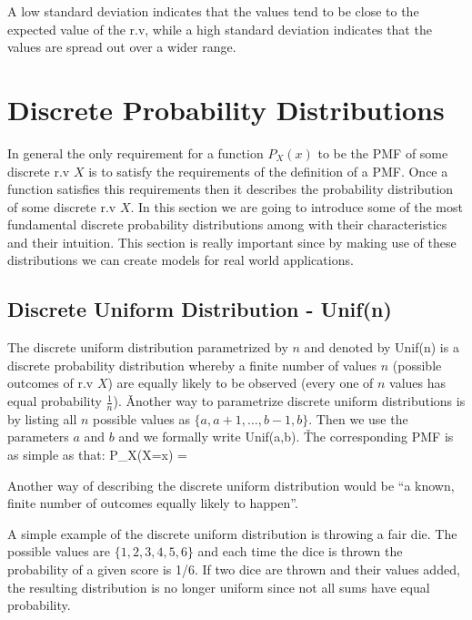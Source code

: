 A low standard deviation indicates that the values tend to be close to the expected value of the r.v, while a high
standard deviation indicates that the values are spread out over a wider range.

\section{Discrete Probability Distributions}

In general the only requirement for a function $P_{X}(x)$ to be the PMF of some discrete r.v $X$ is to satisfy the
requirements of the definition of a PMF. Once a function satisfies this requirements then it describes the
probability distribution of some discrete r.v $X$. In this section we are going to introduce some of the most
fundamental discrete probability distributions among with their characteristics and their intuition. This section is
really important since by making use of these distributions we can create models for real world applications.

\subsection{Discrete Uniform Distribution - Unif(n)}

The discrete uniform distribution parametrized by $n$ and denoted by Unif(n) is a discrete probability distribution
whereby a finite number of values $n$ (possible outcomes of r.v $X$) are equally likely to be observed (every one of
$n$ values has equal probability $\frac{1}{n}$). \v

Another way to parametrize discrete uniform distributions is by listing all $n$ possible values as $\{a, a+1, \ldots,
b-1, b\}$. Then we use the parameters $a$ and $b$ and we formally write Unif(a,b). \v

The corresponding PMF is as simple as that:
\bse
P_{X}(X=x) = 
\ese
\ed

Another way of describing the discrete uniform distribution would be ``a known, finite number of outcomes equally
likely to happen''.

\be
A simple example of the discrete uniform distribution is throwing a fair die. The possible values are $\{1, 2, 3, 4,
5, 6\}$ and each time the dice is thrown the probability of a given score is 1/6. If two dice are thrown and their
values added, the resulting distribution is no longer uniform since not all sums have equal probability.
\ee

